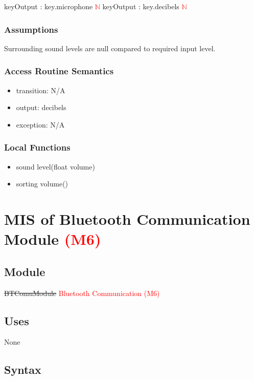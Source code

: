 \documentclass[12pt, titlepage]{article}
\begin{document}
keyOutput : {key.microphone} \textcolor{red}{$\mathbb{N}$ }
\newline
keyOutput : {key.decibels} \textcolor{red}{$\mathbb{N}$}

\subsubsection{Assumptions}

Surrounding sound levels are null compared to required input level.

\subsubsection{Access Routine Semantics}

\noindent
\begin{itemize}
\item transition: N/A 
\item output: decibels
\item exception: N/A
\end{itemize}

\subsubsection{Local Functions}
\begin{itemize}
\item sound level(float volume)
\item sorting volume()
\end{itemize}

\newpage


\section{MIS of Bluetooth Communication Module \textcolor{red}{(M6)}} \label{BTComuModule} 

\subsection{Module}

\sout{BTComuModule} \textcolor{red}{Bluetooth Communication (M6)}

\subsection{Uses}

None

\subsection{Syntax}
\end{document}

